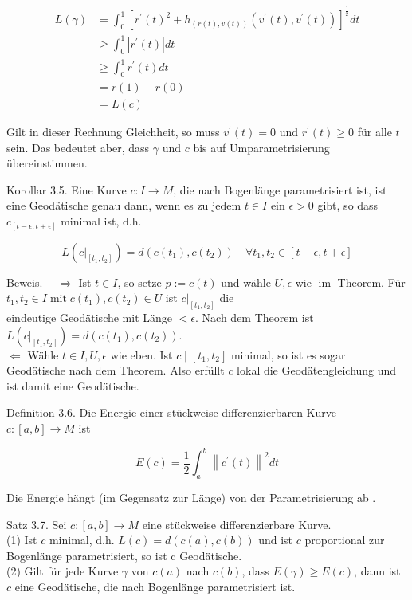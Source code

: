\documentclass[10pt]{article}
\begin{document}
$$
\begin{aligned}
L(\gamma) & =\int_{0}^{1}\left[r^{\prime}(t)^{2}+h_{(r(t), v(t))}\left(v^{\prime}(t), v^{\prime}(t)\right)\right]^{\frac{1}{2}} d t \\
& \geq \int_{0}^{1}\left|r^{\prime}(t)\right| d t \\
& \geq \int_{0}^{1} r^{\prime}(t) d t \\
& =r(1)-r(0) \\
& =L(c)
\end{aligned}
$$

Gilt in dieser Rechnung Gleichheit, so muss $v^{\prime}(t)=0$ und $r^{\prime}(t) \geq 0$ für alle $t$ sein. Das bedeutet aber, dass $\gamma$ und $c$ bis auf Umparametrisierung übereinstimmen.

Korollar 3.5. Eine Kurve $c: I \rightarrow M$, die nach Bogenlänge parametrisiert ist, ist eine Geodätische genau dann, wenn es zu jedem $t \in I$ ein $\epsilon>0$ gibt, so dass $c_{[t-\epsilon, t+\epsilon]}$ minimal ist, d.h.

$$
L\left(\left.c\right|_{\left[t_{1}, t_{2}\right]}\right)=d\left(c\left(t_{1}\right), c\left(t_{2}\right)\right) \quad \forall t_{1}, t_{2} \in[t-\epsilon, t+\epsilon]
$$

Beweis. $\quad \Longrightarrow$ Ist $t \in I$, so setze $p:=c(t)$ und wähle $U, \epsilon$ wie $\operatorname{im}$ Theorem. Für $t_{1}, t_{2} \in I \operatorname{mit} c\left(t_{1}\right), c\left(t_{2}\right) \in U$ ist $\left.c\right|_{\left[t_{1}, t_{2}\right]}$ die\\
eindeutige Geodätische mit Länge $<\epsilon$. Nach dem Theorem ist $L\left(\left.c\right|_{\left[t_{1}, t_{2}\right]}\right)=d\left(c\left(t_{1}\right), c\left(t_{2}\right)\right)$.\\
$\Longleftarrow$ Wähle $t \in I, U, \epsilon$ wie eben. Ist $c \mid\left[t_{1}, t_{2}\right]$ minimal, so ist es sogar Geodätische nach dem Theorem. Also erfüllt $c$ lokal die Geodätengleichung und ist damit eine Geodätische.

Definition 3.6. Die Energie einer stückweise differenzierbaren Kurve $c:[a, b] \rightarrow M$ ist

$$
E(c)=\frac{1}{2} \int_{a}^{b}\left\|c^{\prime}(t)\right\|^{2} d t
$$

Die Energie hängt (im Gegensatz zur Länge) von der Parametrisierung ab .

Satz 3.7. Sei $c:[a, b] \rightarrow M$ eine stückweise differenzierbare Kurve.\\
(1) Ist $c$ minimal, d.h. $L(c)=d(c(a), c(b))$ und ist $c$ proportional zur Bogenlänge parametrisiert, so ist c Geodätische.\\
(2) Gilt für jede Kurve $\gamma$ von $c(a)$ nach $c(b)$, dass $E(\gamma) \geq E(c)$, dann ist $c$ eine Geodätische, die nach Bogenlänge parametrisiert ist.
\end{document}
